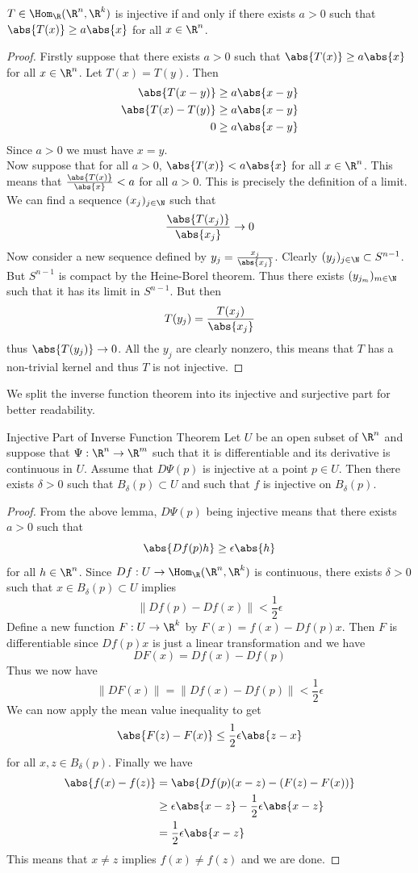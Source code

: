 \documentclass[a4paper]{article}
\begin{document}
\begin{lmm}{}{} $T\in\Hom_\R(\R^n,\R^k)$ is injective if and only if there exists $a>0$ such that $\abs{T(x)}\geq a\abs{x}$ for all $x\in\R^n$. 
\begin{proof}
Firstly suppose that there exists $a>0$ such that $\abs{T(x)}\geq a\abs{x}$ for all $x\in\R^n$. Let $T(x)=T(y)$. Then 
\begin{align*}
\abs{T(x-y)}&\geq a\abs{x-y}\\
\abs{T(x)-T(y)}&\geq a\abs{x-y}\\
0&\geq a\abs{x-y}
\end{align*}
Since $a>0$ we must have $x=y$. \\
Now suppose that for all $a>0$, $\abs{T(x)}<a\abs{x}$ for all $x\in\R^n$. This means that $\frac{\abs{T(x)}}{\abs{x}}<a$ for all $a>0$. This is precisely the definition of a limit. We can find a sequence $(x_j)_{j\in\N}$ such that $$\frac{\abs{T(x_j)}}{\abs{x_j}}\to 0$$ Now consider a new sequence defined by $y_j=\frac{x_j}{\abs{x_j}}$. Clearly $(y_j)_{j\in\N}\subset S^{n-1}$. But $S^{n-1}$ is compact by the Heine-Borel theorem. Thus there exists $(y_{j_m})_{m\in\N}$ such that it has its limit in $S^{n-1}$. But then $$T(y_j)=\frac{T(x_j)}{\abs{x_j}}$$ thus $\abs{T(y_j)}\to 0$. All the $y_j$ are clearly nonzero, this means that $T$ has a non-trivial kernel and thus $T$ is not injective. 
\end{proof}
\end{lmm}

We split the inverse function theorem into its injective and surjective part for better readability. 

\begin{prp}{Injective Part of Inverse Function Theorem}{} Let $U$ be an open subset of $\R^n$ and suppose that $\Psi:\R^n\to\R^m$ such that it is differentiable and its derivative is continuous in $U$. Assume that $D\Psi(p)$ is injective at a point $p\in U$. Then there exists $\delta>0$ such that $B_\delta(p)\subset U$ and such that $f$ is injective on $B_\delta(p)$. 
\begin{proof}
From the above lemma, $D\Psi(p)$ being injective means that there exists $a>0$ such that $$\abs{Df(p)h}\geq\epsilon\abs{h}$$ for all $h\in\R^n$. Since $Df:U\to\Hom_\R(\R^n,\R^k)$ is continuous, there exists $\delta>0$ such that $x\in B_\delta(p)\subset U$ implies $$\|Df(p)-Df(x)\|<\frac{1}{2}\epsilon$$ Define a new function $F:U\to\R^k$ by $F(x)=f(x)-Df(p)x$. Then $F$ is differentiable since $Df(p)x$ is just a linear transformation and we have $$DF(x)=Df(x)-Df(p)$$ Thus we now have $$\|DF(x)\|=\|Df(x)-Df(p)\|<\frac{1}{2}\epsilon$$ We can now apply the mean value inequality to get $$\abs{F(z)-F(x)}\leq\frac{1}{2}\epsilon\abs{z-x}$$ for all $x,z\in B_\delta(p)$. Finally we have 
\begin{align*}
\abs{f(x)-f(z)}&=\abs{Df(p)(x-z)-(F(z)-F(x))}\\
&\geq\epsilon\abs{x-z}-\frac{1}{2}\epsilon\abs{x-z}\\
&=\frac{1}{2}\epsilon\abs{x-z}
\end{align*}
This means that $x\neq z$ implies $f(x)\neq f(z)$ and we are done. 
\end{proof}
\end{prp}
\end{document}
